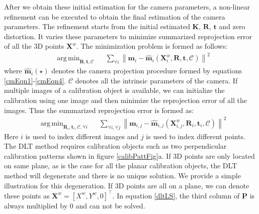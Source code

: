 \documentclass{report}
\DeclareMathOperator*{\argmin}{arg\,min}
\begin{document}
After we obtain these initial estimation for the camera parameters, a non-linear refinement can be executed to obtain the final estimation of the camera parameters. The refinement starts from the initial estimated $\mathbf{K}$, $\mathbf{R}$, $\mathbf{t}$ and zero distortion. It varies these parameters to minimize summarized reprojection error of all the 3D points $\mathbf{X}^w$. The minimization problem is formed as follows: 
\begin{equation}
\begin{aligned}
& \argmin_{\mathbf{R}, \mathbf{t}, \mathcal{C}} & & \sum_{\forall i} \left \| \mathbf{m}_i - \hat{\mathbf{m}}_i(\mathbf{X}^w_i, \mathbf{R}, \mathbf{t}, \mathcal{C}) \right \|^2
\end{aligned}
\label{dltOptEqn}
\end{equation}
where $\hat{\mathbf{m}}_i(\star)$ denotes the camera projection procedure formed by equations \ref{cmEqn1}-\ref{cmEqn4}. $\mathcal{C}$ denotes all the intrinsic parameters of the camera. If multiple images of a calibration object is available, we can initialize the calibration using one image and then minimize the reprojection error of all the images. Thus the summarized reprojection error is formed as: 
\begin{equation}
\begin{aligned}
& \argmin_{\mathbf{R}_i, \mathbf{t}_i, \mathcal{C}, \forall i} & & \sum_{\forall i, \forall j} \left \| \mathbf{m}_{i, j} - \hat{\mathbf{m}}_{i, j}(\mathbf{X}^w_{i, j}, \mathbf{R}_i, \mathbf{t}_i, \mathcal{C}) \right \|^2
\end{aligned}
\label{dltAllOptEqn}
\end{equation}
Here $i$ is used to index different images and $j$ is used to index different points. The DLT method requires calibration objects such as two perpendicular calibration patterns shown in figure \ref{calibPattFig}a. If 3D points are only located on same plane, as is the case for all the planar calibration objects, the DLT method will degenerate and there is no unique solution. We provide a simple illustration for this degeneration. If 3D points are all on a plane, we can denote these points as $\mathbf{X}^w = [X^w, Y^w, 0]^\top$. In equation \ref{dltLS}, the third column of $\mathbf{P}$ is always multiplied by 0 and can not be solved. 
\end{document}
